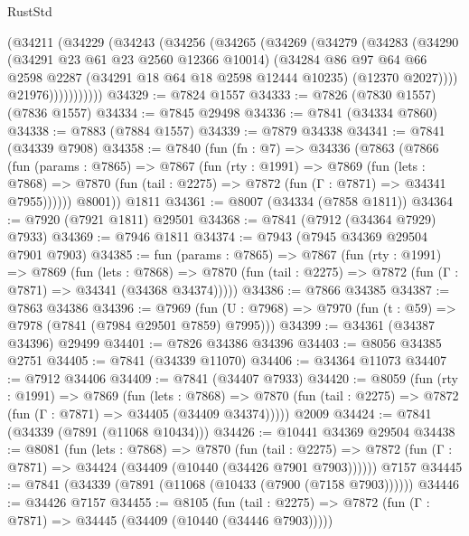 \begin{lexlean}{RustStd}
\begin{coremodule}
            (@34211
              (@34229
                (@34243
                  (@34256
                    (@34265
                      (@34269
                        (@34279
                          (@34283
                            (@34290
                              (@34291 @23 @61 @23 @2560 @12366 @10014)
                              (@34284
                                @86
                                @97
                                @64
                                @66
                                @2598
                                @2287
                                (@34291 @18 @64 @18 @2598 @12444 @10235)
                                (@12370 @2027))))
                          @21976)))))))))))
@34329 := @7824 @1557
@34333 := @7826 (@7830 @1557) (@7836 @1557)
@34334 := @7845 @29498
@34336 := @7841 (@34334 @7860)
@34338 := @7883 (@7884 @1557)
@34339 := @7879 @34338
@34341 := @7841 (@34339 @7908)
@34358 := @7840
    (fun (fn : @7) =>
    @34336
      (@7863
        (@7866
          (fun (params : @7865) =>
          @7867
            (fun (rty : @1991) =>
            @7869
              (fun (lets : @7868) =>
              @7870 (fun (tail : @2275) => @7872 (fun (Γ : @7871) => @34341 @7955))))))
        @8001))
    @1811
@34361 := @8007 (@34334 (@7858 @1811))
@34364 := @7920 (@7921 @1811) @29501
@34368 := @7841 (@7912 (@34364 @7929) @7933)
@34369 := @7946 @1811
@34374 := @7943 (@7945 @34369 @29504 @7901 @7903)
@34385 := fun (params : @7865) =>
  @7867
    (fun (rty : @1991) =>
    @7869
      (fun (lets : @7868) =>
      @7870 (fun (tail : @2275) => @7872 (fun (Γ : @7871) => @34341 (@34368 @34374)))))
@34386 := @7866 @34385
@34387 := @7863 @34386
@34396 := @7969
    (fun (U : @7968) => @7970 (fun (t : @59) => @7978 (@7841 (@7984 @29501 @7859) @7995)))
@34399 := @34361 (@34387 @34396) @29499
@34401 := @7826 @34386 @34396
@34403 := @8056 @34385 @2751
@34405 := @7841 (@34339 @11070)
@34406 := @34364 @11073
@34407 := @7912 @34406
@34409 := @7841 (@34407 @7933)
@34420 := @8059
    (fun (rty : @1991) =>
    @7869
      (fun (lets : @7868) =>
      @7870 (fun (tail : @2275) => @7872 (fun (Γ : @7871) => @34405 (@34409 @34374)))))
    @2009
@34424 := @7841 (@34339 (@7891 (@11068 @10434)))
@34426 := @10441 @34369 @29504
@34438 := @8081
    (fun (lets : @7868) =>
    @7870
      (fun (tail : @2275) =>
      @7872 (fun (Γ : @7871) => @34424 (@34409 (@10440 (@34426 @7901 @7903))))))
    @7157
@34445 := @7841 (@34339 (@7891 (@11068 (@10433 (@7900 (@7158 @7903))))))
@34446 := @34426 @7157
@34455 := @8105
    (fun (tail : @2275) => @7872 (fun (Γ : @7871) => @34445 (@34409 (@10440 (@34446 @7903)))))

\end{coremodule}
\end{lexlean}
